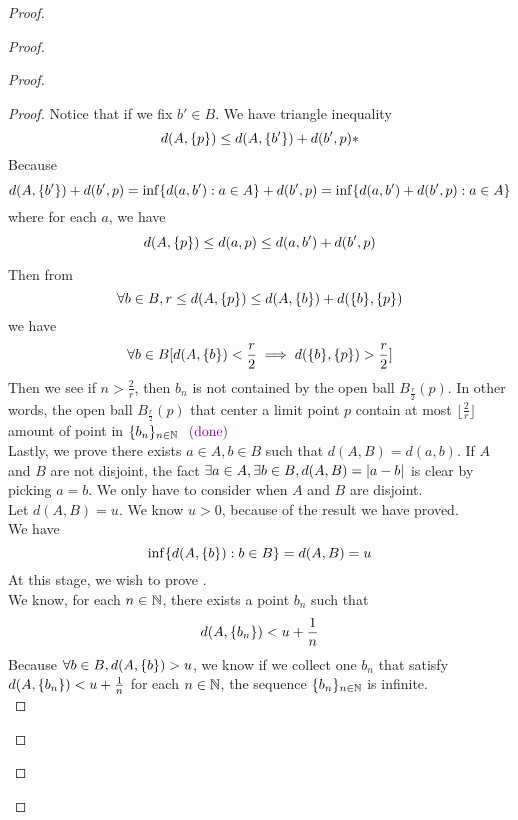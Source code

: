 \documentclass{report}
\begin{document}
\begin{proof}
\begin{proof}
\begin{proof}
\begin{proof}
Notice that if we fix $b'\in B$. We have triangle inequality
\begin{equation}
d(A,\{ p \})\leq d(A,\{ b' \})+d(b',p)*
\end{equation}
Because 
\begin{equation}
d(A,\{ b' \})+d(b',p)=\inf \{ d(a,b'):a \in A \}+d(b',p)=\inf \{ d(a,b')+d(b',p):a \in A \}
\end{equation}
where for each $a$, we have
 \begin{equation}
d(A,\{ p \})\leq d(a,p)\leq d(a,b')+d(b',p)
\end{equation}



Then from
\begin{equation}
  \forall b\in B, r\leq d(A,\{ p \})\leq d(A,\{ b \})+d(\{ b \},\{ p \})
\end{equation}
we have
\begin{equation}
  \forall b\in B [d(A,\{ b \})< \frac{r}{2}\implies d(\{ b \},\{ p \})>\frac{r}{2}]
\end{equation}
Then we see if $n>\frac{2}{r}$, then $b_n$ is not contained by the open ball  $B_{\frac{r}{2}}(p)$. In other words, the open ball $B_{\frac{r}{2}}(p)$ that center a limit point $p$ contain at most $\lfloor \frac{2}{r}\rfloor$ amount of point in $\{ b_n \}_{n\in\mathbb{N}}$ \CaC$\textcolor{violet}{\text{ (done) }}$\\

Lastly, we prove there exists $a\in A,b\in B$ such that $d(A,B)=d(a,b)$. If  $A$ and  $B$ are not disjoint, the fact $\exists a\in A,\exists b\in B, d(A,B)=|a-b|$ is clear by picking $a=b$. We only have to consider when $A$ and $B$ are disjoint.\\

Let $d(A,B)=u$. We know $u>0$, because of the result we have proved.\\

We have 
\begin{equation}
  \inf \{ d(A,\{ b \}):b\in B \}=d(A,B)=u
\end{equation}
At this stage, we wish to prove . \\

We know, for each $n\in\mathbb{N}$, there exists a point $b_n$ such that
 \begin{equation}
d(A,\{ b_n \})<u+\frac{1}{n}
\end{equation}
Because $\forall b\in B, d(A,\{ b \})>u$, we know if we collect one $b_n$ that satisfy $d(A,\{ b_n \})<u+\frac{1}{n}$ for each $n\in\mathbb{N}$, the sequence $\{ b_n \}_{n\in\mathbb{N}}$ is infinite.\\


\end{proof}
\end{proof}
\end{proof}
\end{proof}
\end{document}
